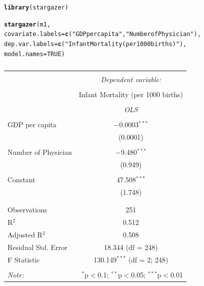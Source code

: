 \documentclass{article}\usepackage[]{graphicx}\usepackage[]{color}
\makeatletter
\newcommand{\hlnum}[1]{\textcolor[rgb]{0.686,0.059,0.569}{#1}}%
\newcommand{\hlstr}[1]{\textcolor[rgb]{0.192,0.494,0.8}{#1}}%
\newcommand{\hlstd}[1]{\textcolor[rgb]{0.345,0.345,0.345}{#1}}%
\newcommand{\hlkwc}[1]{\textcolor[rgb]{0.333,0.667,0.333}{#1}}%
\newcommand{\hlkwd}[1]{\textcolor[rgb]{0.737,0.353,0.396}{\textbf{#1}}}%
\newenvironment{kframe}{%
 \def\at@end@of@kframe{}%
 \ifinner\ifhmode%
  \def\at@end@of@kframe{\end{minipage}}%
  \begin{minipage}{\columnwidth}%
 \fi\fi%
 \def\FrameCommand##1{\hskip\@totalleftmargin \hskip-\fboxsep
 \colorbox{shadecolor}{##1}\hskip-\fboxsep
     \hskip-\linewidth \hskip-\@totalleftmargin \hskip\columnwidth}%
 \MakeFramed {\advance\hsize-\width
   \@totalleftmargin\z@ \linewidth\hsize
   \@setminipage}}%
 {\par\unskip\endMakeFramed%
 \at@end@of@kframe}
\makeatother
\begin{document}
\begin{kframe}
\begin{alltt}
\hlkwd{library}\hlstd{(stargazer)}
\end{alltt}


{\ttfamily\noindent\itshape\color{messagecolor}{\#\# \\\#\# Please cite as: \\\#\# \\\#\#\ \ Hlavac, Marek (2014). stargazer: LaTeX code and ASCII text for well-formatted regression and summary statistics tables.\\\#\#\ \ R package version 5.1. http://CRAN.R-project.org/package=stargazer}}\begin{alltt}
\hlkwd{stargazer}\hlstd{(m1,}
          \hlkwc{covariate.labels} \hlstd{=} \hlkwd{c}\hlstd{(}\hlstr{"GDP per capita"}\hlstd{,} \hlstr{"Number of Physician"}\hlstd{),}
          \hlkwc{dep.var.labels} \hlstd{=} \hlkwd{c}\hlstd{(}\hlstr{"Infant Mortality (per 1000 births)"}\hlstd{),}
          \hlkwc{model.names} \hlstd{=} \hlnum{TRUE}\hlstd{)}
\end{alltt}
\end{kframe}
\begin{table}[!htbp] \centering 
  \caption{} 
  \label{} 
\begin{tabular}{@{\extracolsep{5pt}}lc} 
\\[-1.8ex]\hline 
\hline \\[-1.8ex] 
 & \multicolumn{1}{c}{\textit{Dependent variable:}} \\ 
\cline{2-2} 
\\[-1.8ex] & Infant Mortality (per 1000 births) \\ 
\\[-1.8ex] & \textit{OLS} \\ 
\hline \\[-1.8ex] 
 GDP per capita & $-$0.0003$^{***}$ \\ 
  & (0.0001) \\ 
  & \\ 
 Number of Physician & $-$9.480$^{***}$ \\ 
  & (0.949) \\ 
  & \\ 
 Constant & 47.508$^{***}$ \\ 
  & (1.748) \\ 
  & \\ 
\hline \\[-1.8ex] 
Observations & 251 \\ 
R$^{2}$ & 0.512 \\ 
Adjusted R$^{2}$ & 0.508 \\ 
Residual Std. Error & 18.344 (df = 248) \\ 
F Statistic & 130.149$^{***}$ (df = 2; 248) \\ 
\hline 
\hline \\[-1.8ex] 
\textit{Note:}  & \multicolumn{1}{r}{$^{*}$p$<$0.1; $^{**}$p$<$0.05; $^{***}$p$<$0.01} \\ 
\end{tabular} 
\end{table} 
\end{document}
